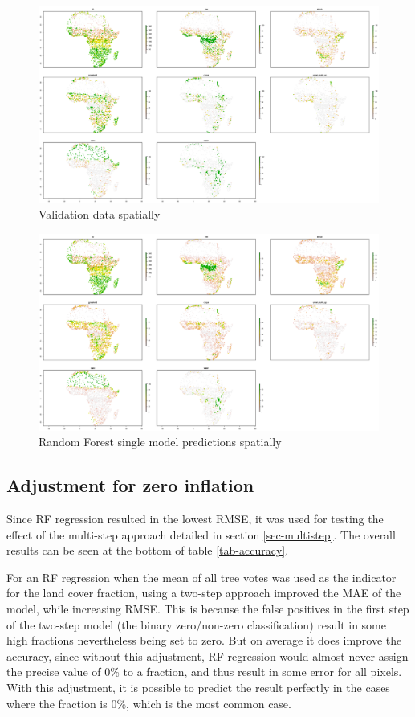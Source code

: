 \documentclass[a4paper,10pt]{article}
\begin{document}
\begin{figure}
    \includegraphics[width=\textwidth]{article-figures/maps/2019-04-10-rasterised-validation}
    \caption{Validation data spatially}
    \label{raster-validation}
\end{figure}
\begin{figure}
    \includegraphics[width=\textwidth]{article-figures/maps/2019-04-10-rasterised-rf-1m-uncor}
    \caption{Random Forest single model predictions spatially}
    \label{raster-rf-1m-uncor}
\end{figure}

\subsection{Adjustment for zero inflation}

Since \gls{RF} regression resulted in the lowest RMSE, it was used for testing the effect of the multi-step approach detailed in section \ref{sec-multistep}.
The overall results can be seen at the bottom of table \ref{tab-accuracy}.

For an \gls{RF} regression when the mean of all tree votes was used as the indicator for the land cover fraction, using a two-step approach improved the \gls{MAE} of the model, while increasing \gls{RMSE}.
This is because the false positives in the first step of the two-step model (the binary zero/non-zero classification) result in some high fractions nevertheless being set to zero.
But on average it does improve the accuracy, since without this adjustment, \gls{RF} regression would almost never assign the precise value of 0\% to a fraction, and thus result in some error for all pixels.
With this adjustment, it is possible to predict the result perfectly in the cases where the fraction is 0\%, which is the most common case.
\end{document}
